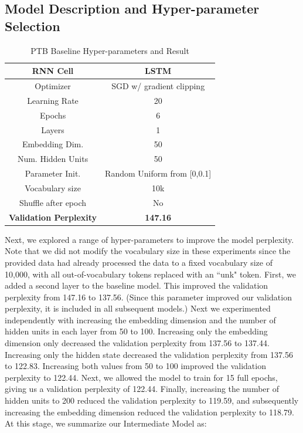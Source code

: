 \documentclass[a4paper]{article}
\begin{document}
\subsection*{Model Description and Hyper-parameter Selection}

\begin{table}[h]
\centering
\begin{tabular}{|c | c|} 
 \hline
RNN Cell & LSTM\\ \hline
Optimizer & SGD w/ gradient clipping \\ \hline
Learning Rate & 20 \\ \hline
Epochs & 6\\ \hline
Layers & 1\\ \hline
Embedding Dim. & 50\\ \hline
Num. Hidden Units & 50\\ \hline
Parameter Init. & Random Uniform from [0,0.1]\\ \hline
Vocabulary size & 10k\\ \hline
Shuffle after epoch & No \\ \hline
\textbf{Validation Perplexity} &\textbf{147.16} \\ \hline
\end{tabular}
\caption{PTB Baseline Hyper-parameters and Result}
\label{table:1}
\end{table}

Next, we explored a range of hyper-parameters to improve the model perplexity. Note that we did not modify the vocabulary size in these experiments since the provided data had already processed the data to a fixed vocabulary size of 10,000, with all out-of-vocabulary tokens replaced with an ``unk" token. 
\newline
\newline
First, we added a second layer to the baseline model. This improved the validation perplexity from 147.16 to 137.56. (Since this parameter improved our validation perplexity, it is included in all subsequent models.) Next we experimented independently with increasing the embedding dimension and the number of hidden units in each layer from 50 to 100. Increasing only the embedding dimension only decreased the validation perplexity from 137.56 to 137.44. Increasing only the hidden state decreased the validation perplexity from 137.56 to 122.83. Increasing both values from 50 to 100 improved the validation perplexity to 122.44. Next, we allowed the model to train for 15 full epochs, giving us a validation perplexity of 122.44. Finally, increasing the number of hidden units to 200 reduced the validation perplexity to 119.59, and subsequently increasing the embedding dimension reduced the validation perplexity to 118.79.
\newline
\newline
At this stage, we summarize our Intermediate Model as:
\end{document}

